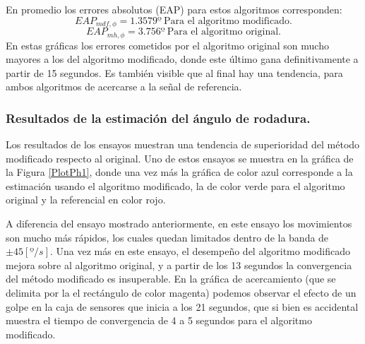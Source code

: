 \documentclass[10pt]{report}
\numberwithin{equation}{chapter}
\numberwithin{algorithm}{chapter}
\begin{document}
En promedio los errores absolutos (EAP) para estos algoritmos corresponden:
\begin{equation*}
EAP_{mdf,\phi}=1.3579º~\text{Para el algoritmo modificado.}
\end{equation*}
\begin{equation*}
EAP_{mh,\phi}=3.756º~\text{Para el algoritmo original.}
\end{equation*}
En estas gráficas los errores cometidos por el algoritmo original son mucho mayores a los del algoritmo modificado, donde este último gana definitivamente a partir de 15 segundos. Es también visible que al final hay una tendencia, para ambos algoritmos de acercarse a la señal de referencia.
\subsubsection{Resultados de la estimación del ángulo de rodadura.}
Los resultados de los ensayos muestran una tendencia de superioridad del método modificado respecto al original. Uno de estos ensayos se muestra en la gráfica de la Figura \ref{PlotPh1}, donde una vez más la gráfica de color azul corresponde a la estimación usando el algoritmo modificado, la de color verde para el algoritmo original y la referencial en color rojo. \par
A diferencia del ensayo mostrado anteriormente, en este ensayo los movimientos son mucho más rápidos, los cuales quedan limitados dentro de la banda de $\pm45[º/s]$. Una vez más en este ensayo, el desempeño del algoritmo modificado mejora sobre al algoritmo original, y a partir de los 13 segundos la convergencia del método modificado es insuperable. En la gráfica de acercamiento (que se delimita por la el rectángulo de color magenta) podemos observar el efecto de un golpe en la caja de sensores que inicia a los 21 segundos, que si bien es accidental muestra el tiempo de convergencia de 4 a 5 segundos para el algoritmo modificado.\par
\end{document}
